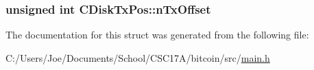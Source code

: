 \subsubsection[{n\+Tx\+Offset}]{\setlength{\rightskip}{0pt plus 5cm}unsigned int C\+Disk\+Tx\+Pos\+::n\+Tx\+Offset}\label{struct_c_disk_tx_pos_af19fa085a69ba3bac7b52413a37adf23}


The documentation for this struct was generated from the following file\+:\begin{DoxyCompactItemize}
\item 
C\+:/\+Users/\+Joe/\+Documents/\+School/\+C\+S\+C17\+A/bitcoin/src/\hyperlink{main_8h}{main.\+h}\end{DoxyCompactItemize}
